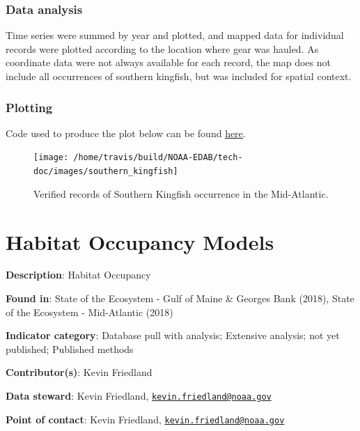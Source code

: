 \documentclass[
]{book}
\begin{document}
\hypertarget{data-analysis-23}{%
\subsection{Data analysis}\label{data-analysis-23}}

Time series were summed by year and plotted, and mapped data for individual records were plotted according to the location where gear was hauled. As coordinate data were not always available for each record, the map does not include all occurrences of southern kingfish, but was included for spatial context.

\hypertarget{plotting-18}{%
\subsection{Plotting}\label{plotting-18}}

Code used to produce the plot below can be found \href{https://github.com/NOAA-EDAB/tech-doc/tree/master/R/stored_scripts/observer_data_plotting.R}{here}.

\begin{figure}

{\centering \texttt{[image: /home/travis/build/NOAA-EDAB/tech-doc/images/southern\_kingfish]} 

}

\caption{Verified records of Southern Kingfish occurrence in the Mid-Atlantic.}\label{fig:SK-plot}
\end{figure}

\hypertarget{hab-occu}{%
\chapter{Habitat Occupancy Models}\label{hab-occu}}

\textbf{Description}: Habitat Occupancy

\textbf{Found in}: State of the Ecosystem - Gulf of Maine \& Georges Bank (2018), State of the Ecosystem - Mid-Atlantic (2018)

\textbf{Indicator category}: Database pull with analysis; Extensive analysis; not yet published; Published methods

\textbf{Contributor(s)}: Kevin Friedland

\textbf{Data steward}: Kevin Friedland, \href{mailto:kevin.friedland@noaa.gov}{\nolinkurl{kevin.friedland@noaa.gov}}

\textbf{Point of contact}: Kevin Friedland, \href{mailto:kevin.friedland@noaa.gov}{\nolinkurl{kevin.friedland@noaa.gov}}
\end{document}
